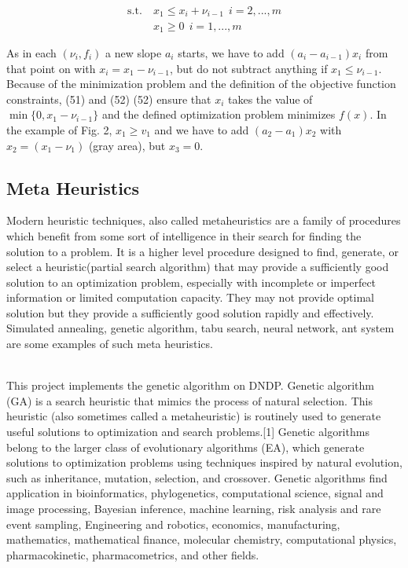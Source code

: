 \documentclass[a4paper, 12pt]{article}
\begin{document}
\begin{large}
\begin{align*}
\mathrm{s.t.}\ &x_{1}\leq x_{i}+\nu_{i-1}\ \ i=2,...,m \\
&x_{1}\geq0\ \ i=1,...,m
\end{align*}
\end{large}
As in each $\left(\nu_{i},f_{i}\right)$ a new slope $a_i$ starts, we have to add $\left(a_i-a_{i-1}\right)x_{i}$ from that point on with $x_{i}=x_{1}-\nu_{i-1}$, but do not subtract anything if $x_{1} \le \nu_{i-1}$. Because of the minimization problem and the definition of the objective function constraints, (51) and (52) (52) ensure that $x_{i}$ takes the value of $\min\{0,x_{1}-\nu_{i-1}\}$ and the defined optimization problem minimizes $f(x)$. In the example of Fig. 2, $x_1 \ge v_1$ and we have to add $\left(a_2 - a_1\right)x_2$ with $x_2=\left(x_1-\nu_1\right)$ (gray area), but $x_3=0$.

\subsection{Meta Heuristics}
Modern heuristic techniques, also called metaheuristics are a family of procedures which benefit from some sort of intelligence in their search for finding the solution to a problem. It is a higher level procedure designed to find, generate, or select a heuristic(partial search algorithm) that may provide a sufficiently good solution to an optimization problem, especially with incomplete or imperfect information or limited computation capacity. They may not provide optimal solution but they provide a sufficiently good solution rapidly and effectively. Simulated annealing, genetic algorithm, tabu search, neural network, ant system are some examples of such meta heuristics.\par
\noindent
\\This project implements the genetic algorithm on DNDP. Genetic algorithm (GA) is a search heuristic that mimics the process of natural selection. This heuristic (also sometimes called a metaheuristic) is routinely used to generate useful solutions to optimization and search problems.[1] Genetic algorithms belong to the larger class of evolutionary algorithms (EA), which generate solutions to optimization problems using techniques inspired by natural evolution, such as inheritance, mutation, selection, and crossover. Genetic algorithms find application in bioinformatics, phylogenetics, computational science, signal and image processing, Bayesian inference, machine learning, risk analysis and rare event sampling, Engineering and robotics, economics, manufacturing, mathematics, mathematical finance, molecular chemistry, computational physics, pharmacokinetic, pharmacometrics, and other fields.\par
\noindent
\end{document}
